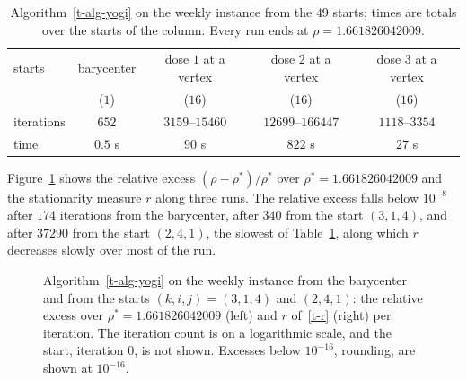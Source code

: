 \documentclass[11pt]{article}
\theoremstyle{plain}
\theoremstyle{remark}
\numberwithin{equation}{section}
\begin{document}
\begin{table}[ht]
\centering
\small
\begin{tabular}{lcccc}
\hline
starts & barycenter & dose $1$ at a vertex & dose $2$ at a vertex & dose $3$ at a vertex\\
 & ($1$) & ($16$) & ($16$) & ($16$)\\
\hline
iterations & $652$ & $3159$--$15460$ & $12699$--$166447$ & $1118$--$3354$\\
time & $0.5$ s & $90$ s & $822$ s & $27$ s\\
\hline
\end{tabular}
\caption{Algorithm~\ref{t-alg-yogi} on the weekly instance from the $49$
starts; times are totals over the starts of the column. Every run ends at
$\rho=1.661826042009$.}\label{t-tab-yogi}
\end{table}

Figure~\ref{t-fig-conv} shows the relative excess $(\rho-\rho^*)/\rho^*$ over
$\rho^*=1.661826042009$ and the stationarity measure $r$ along three runs. The
relative excess falls below $10^{-8}$ after $174$ iterations from the
barycenter, after $340$ from the start $(3,1,4)$, and after $37290$ from the
start $(2,4,1)$, the slowest of Table~\ref{t-tab-yogi}, along which $r$
decreases slowly over most of the run.

\begin{figure}[ht]
\centering
{}
\caption{Algorithm~\ref{t-alg-yogi} on the weekly instance from the barycenter
and from the starts $(k,i,j)=(3,1,4)$ and $(2,4,1)$: the relative excess over
$\rho^*=1.661826042009$ (left) and $r$ of~\eqref{t-r} (right) per iteration.
The iteration count is on a logarithmic scale, and the start, iteration $0$,
is not shown. Excesses below $10^{-16}$, rounding, are shown at
$10^{-16}$.}\label{t-fig-conv}
\end{figure}
\end{document}
